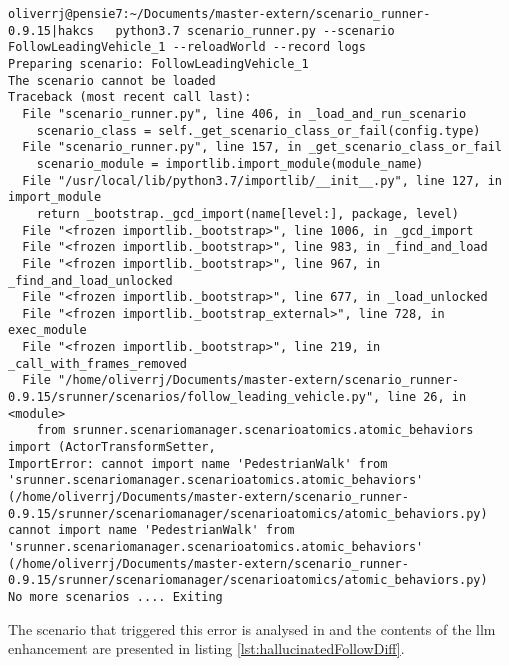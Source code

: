 \begin{lstlisting}[caption={Error message when running the the initially enhanced  FollowLeadingVehicle scenario with halluciantion. }, label={lst:hallucinatedFollowError}]
    oliverrj@pensie7:~/Documents/master-extern/scenario_runner-0.9.15|hakcs   python3.7 scenario_runner.py --scenario FollowLeadingVehicle_1 --reloadWorld --record logs
Preparing scenario: FollowLeadingVehicle_1
The scenario cannot be loaded
Traceback (most recent call last):
  File "scenario_runner.py", line 406, in _load_and_run_scenario
    scenario_class = self._get_scenario_class_or_fail(config.type)
  File "scenario_runner.py", line 157, in _get_scenario_class_or_fail
    scenario_module = importlib.import_module(module_name)
  File "/usr/local/lib/python3.7/importlib/__init__.py", line 127, in import_module
    return _bootstrap._gcd_import(name[level:], package, level)
  File "<frozen importlib._bootstrap>", line 1006, in _gcd_import
  File "<frozen importlib._bootstrap>", line 983, in _find_and_load
  File "<frozen importlib._bootstrap>", line 967, in _find_and_load_unlocked
  File "<frozen importlib._bootstrap>", line 677, in _load_unlocked
  File "<frozen importlib._bootstrap_external>", line 728, in exec_module
  File "<frozen importlib._bootstrap>", line 219, in _call_with_frames_removed
  File "/home/oliverrj/Documents/master-extern/scenario_runner-0.9.15/srunner/scenarios/follow_leading_vehicle.py", line 26, in <module>
    from srunner.scenariomanager.scenarioatomics.atomic_behaviors import (ActorTransformSetter,
ImportError: cannot import name 'PedestrianWalk' from 'srunner.scenariomanager.scenarioatomics.atomic_behaviors' (/home/oliverrj/Documents/master-extern/scenario_runner-0.9.15/srunner/scenariomanager/scenarioatomics/atomic_behaviors.py)
cannot import name 'PedestrianWalk' from 'srunner.scenariomanager.scenarioatomics.atomic_behaviors' (/home/oliverrj/Documents/master-extern/scenario_runner-0.9.15/srunner/scenariomanager/scenarioatomics/atomic_behaviors.py)
No more scenarios .... Exiting

\end{lstlisting}

The scenario that triggered this error is analysed in  and the
contents of the \acrshort{llm} enhancement are presented in listing
\ref{lst:hallucinatedFollowDiff}.


